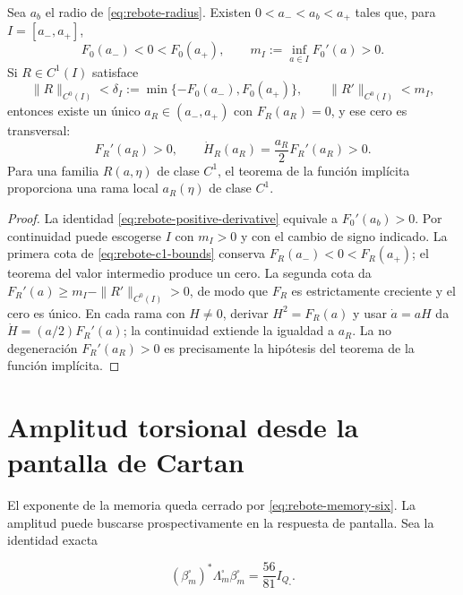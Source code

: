 \begin{theorem}
\label{thm:rebote-c1-persistence}
Sea \(a_b\) el radio de \cref{eq:rebote-radius}. Existen
\(0<a_-<a_b<a_+\) tales que, para
\(I=[a_-,a_+]\),
\[
 F_0(a_-)<0<F_0(a_+),
 \qquad
 m_I:=\inf_{a\in I}F_0'(a)>0.
\]
Si \(R\in C^1(I)\) satisface
\begin{equation}
 \|R\|_{C^0(I)}
 <\delta_I
 :=\min\{-F_0(a_-),F_0(a_+)\},
 \qquad
 \|R'\|_{C^0(I)}<m_I,
 \label{eq:rebote-c1-bounds}
\end{equation}
entonces existe un único \(a_R\in(a_-,a_+)\) con \(F_R(a_R)=0\), y
ese cero es transversal:
\begin{equation}
 F_R'(a_R)>0,
 \qquad
 \dot H_R(a_R)=\frac{a_R}{2}F_R'(a_R)>0.
 \label{eq:rebote-perturbed-transversality}
\end{equation}
Para una familia \(R(a,\eta)\) de clase \(C^1\), el teorema de la funci\'on
impl\'icita proporciona una rama local \(a_R(\eta)\) de clase \(C^1\).
\end{theorem}

\begin{proof}
La identidad \cref{eq:rebote-positive-derivative} equivale a
\(F_0'(a_b)>0\). Por continuidad puede escogerse \(I\) con
\(m_I>0\) y con el cambio de signo indicado. La primera cota de
\cref{eq:rebote-c1-bounds} conserva
\(F_R(a_-)<0<F_R(a_+)\); el teorema del valor intermedio produce un cero.
La segunda cota da
\(F_R'(a)\geq m_I-\|R'\|_{C^0(I)}>0\), de modo que \(F_R\) es estrictamente
creciente y el cero es único. En cada rama con \(H\neq0\), derivar
\(H^2=F_R(a)\) y usar \(\dot a=aH\) da
\(\dot H=(a/2)F_R'(a)\); la continuidad extiende la igualdad a \(a_R\).
La no degeneración \(F_R'(a_R)>0\) es precisamente la hipótesis del
teorema de la función implícita.
\end{proof}

\section{Amplitud torsional desde la pantalla de Cartan}

El exponente de la memoria queda cerrado por
\cref{eq:rebote-memory-six}.  La amplitud puede buscarse prospectivamente en
la respuesta de pantalla.  Sea la identidad exacta

\begin{equation}
 (\beta_m^{\square})^*\Lambda_m^{\square}\beta_m^{\square}
 =\frac{56}{81}I_{Q_{\square}}.
 \label{eq:rebote-screen-energy}
\end{equation}

